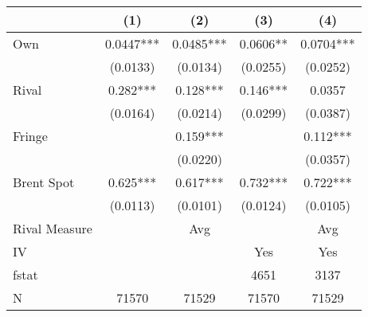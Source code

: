 {
\def\sym#1{\ifmmode^{#1}\else\(^{#1}\)\fi}
\begin{tabular}{l*{4}{c}}
\toprule
                &\multicolumn{1}{c}{(1)}   &\multicolumn{1}{c}{(2)}   &\multicolumn{1}{c}{(3)}   &\multicolumn{1}{c}{(4)}   \\
\midrule
Own             &   0.0447***&   0.0485***&   0.0606** &   0.0704***\\
                & (0.0133)   & (0.0134)   & (0.0255)   & (0.0252)   \\
\addlinespace
Rival           &    0.282***&    0.128***&    0.146***&   0.0357   \\
                & (0.0164)   & (0.0214)   & (0.0299)   & (0.0387)   \\
\addlinespace
Fringe          &            &    0.159***&            &    0.112***\\
                &            & (0.0220)   &            & (0.0357)   \\
\addlinespace
Brent Spot      &    0.625***&    0.617***&    0.732***&    0.722***\\
                & (0.0113)   & (0.0101)   & (0.0124)   & (0.0105)   \\
\midrule
Rival Measure   &            &      Avg   &            &      Avg   \\
IV              &            &            &      Yes   &      Yes   \\
fstat           &            &            &     4651   &     3137   \\
N               &    71570   &    71529   &    71570   &    71529   \\
\bottomrule
\end{tabular}
}
